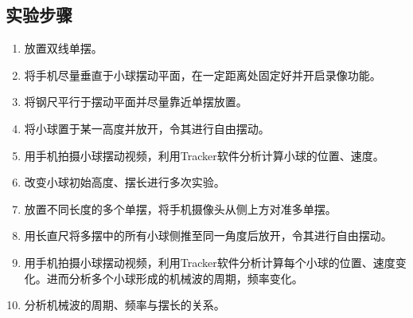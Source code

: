 \documentclass[UTF8]{article}
\begin{document}
        \subsection{实验步骤}
            \begin{enumerate}[left=2em, label=(\arabic*)]
                \item 放置双线单摆。
                \item 将手机尽量垂直于小球摆动平面，在一定距离处固定好并开启录像功能。
                \item 将钢尺平行于摆动平面并尽量靠近单摆放置。
                \item 将小球置于某一高度并放开，令其进行自由摆动。
                \item 用手机拍摄小球摆动视频，利用Tracker软件分析计算小球的位置、速度。
                \item 改变小球初始高度、摆长进行多次实验。
                \item 放置不同长度的多个单摆，将手机摄像头从侧上方对准多单摆。
                \item 用长直尺将多摆中的所有小球侧推至同一角度后放开，令其进行自由摆动。
                \item 用手机拍摄小球摆动视频，利用Tracker软件分析计算每个小球的位置、速度变化。进而分析多个小球形成的机械波的周期，频率变化。
                \item 分析机械波的周期、频率与摆长的关系。
            \end{enumerate}
\end{document}
